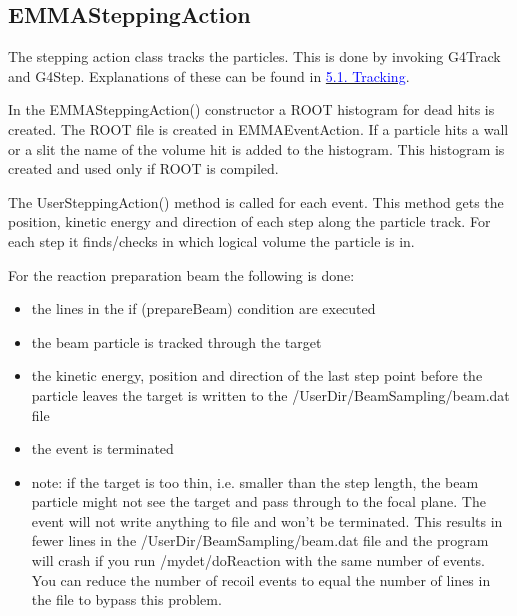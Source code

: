 \documentclass[letter,12pt]{article}
\newcommand{\filefont}[1]{{\fontfamily{pnc}\selectfont #1}\xspace}
\newcommand{\hrefcolor}[2]{\href{#1}{\textcolor{blue}{#2}}\xspace}
\begin{document}
\subsection{EMMASteppingAction}

The stepping action class tracks the particles. This is done by invoking \filefont{G4Track} and \filefont{G4Step}. Explanations of these can be found in \hrefcolor{http://geant4.web.cern.ch/geant4/UserDocumentation/UsersGuides/ForApplicationDeveloper/html/ch05.html\#sect.Track}{5.1.  Tracking}.

In the \filefont{EMMASteppingAction()} constructor a ROOT histogram for dead hits is created. The ROOT file is created in \filefont{EMMAEventAction}. If a particle hits a wall or a slit the name of the volume hit is added to the histogram. This histogram is created and used only if ROOT is compiled.

The \filefont{UserSteppingAction()} method is called for each event. This method gets the position, kinetic energy and direction of each step along the particle track. For each step it finds/checks in which logical volume the particle is in.

For the reaction preparation beam the following is done:
\begin{itemize}
\item the lines in the \filefont{if (prepareBeam)} condition are executed
\item the beam particle is tracked through the target
\item the kinetic energy, position and direction of the last step point before the particle leaves the target is written to the \filefont{/UserDir/BeamSampling/beam.dat} file
\item the event is terminated
\item note: if the target is too thin, i.e. smaller than the step length, the beam particle might not see the target and pass through to the focal plane. The event will not write anything to file and won't be terminated. This results in fewer lines in the \filefont{/UserDir/BeamSampling/beam.dat} file and the program will crash if you run \filefont{/mydet/doReaction} with the same number of events. You can reduce the number of recoil events to equal the number of lines in the file to bypass this problem.
\end{itemize}
\end{document}
